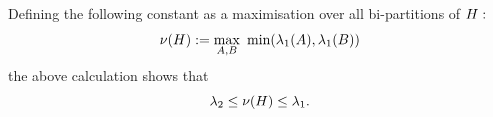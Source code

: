 Defining the following constant as a maximisation over
all bi-partitions of $H:$
$$
    \nu(\Ham) := \max_{A, B}\ \mbox{min}(\lambda_1(A), \lambda_1(B))
$$
the above calculation shows that
$$
    \lambda_2 \le \nu(H) \le \lambda_1.
$$



%

%
%
%

%

%
%
%



